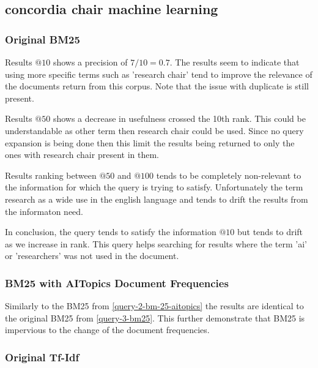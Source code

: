 \subsection{concordia chair machine learning}\label{query-5}

\subsubsection{Original BM25}\label{query-5-bm25}

\par Results $@10$ shows a precision of $7/10=0.7$. The results seem to indicate that using more specific terms such as 'research chair' tend to improve the relevance of the documents return from this corpus. Note that the issue with duplicate is still present.
\par Results $@50$ shows a decrease in usefulness crossed the 10th rank. This could be understandable as other term then research chair could be used. Since no query expansion is being done then this limit the results being returned to only the ones with research chair present in them.
\par Results ranking between $@50$ and $@100$ tends to be completely non-relevant to the information for which the query is trying to satisfy. Unfortunately the term research as a wide use in the english language and tends to drift the results from the informaton need. 
\par In conclusion, the query tends to satisfy the information $@10$ but tends to drift as we increase in rank. This query helps searching for results where the term 'ai' or 'researchers' was not used in the document.

\subsubsection{BM25 with AITopics Document Frequencies}\label{query-5-bm25-aitopics}

\par Similarly to the BM25 from \ref{query-2-bm-25-aitopics} the results are identical to the original BM25 from \ref{query-3-bm25}. This further demonstrate that BM25 is impervious to the change of the document frequencies.

\subsubsection{Original Tf-Idf}\label{query-5-tf-idf}

